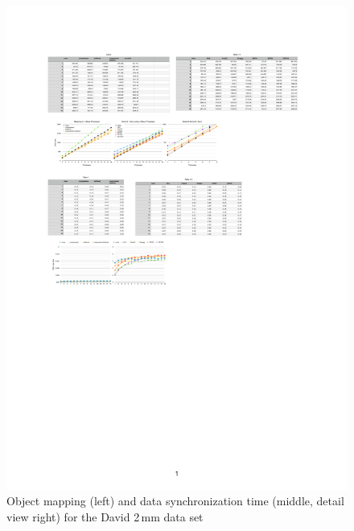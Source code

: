 \documentclass[10pt,journal,compsoc]{IEEEtran}
\begin{document}
\begin{figure}[p!]\center
  \includegraphics[height=.19\textheight]{images/daviddist}
  \caption{\label{fDavidDist}Object mapping (left) and data synchronization
    time (middle, detail view right) for the David 2\,mm data set}
\end{figure}
\end{document}
